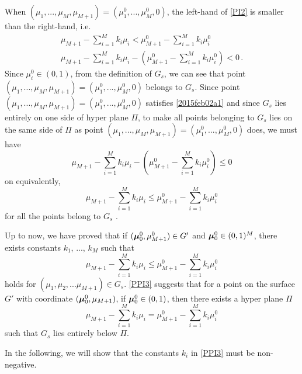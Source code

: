 When $(\mu_1, ... ,\mu_M, \mu_{M+1})=(\mu_1^0, ..., \mu_M^0, 0)$, the left-hand of \eqref{PI2} is smaller than the right-hand, i.e.
\begin{equation}
  \begin{split}
 \mu_{M+1} - \sum_{i=1}^{M}k_i\mu_i < \mu_{M+1}^0 - \sum_{i=1}^{M}k_i\mu_i^0\\
 \mu_{M+1} - \sum_{i=1}^{M}k_i\mu_i - (\mu_{M+1}^0 - \sum_{i=1}^{M}k_i\mu_i^0) < 0\,.
 \end{split}
  \label{2015feb02a1}
\end{equation}
 Since $\mu_i^0 \in (0, 1)$, from the definition of $G_s$, we can see that point $(\mu_1, ... ,\mu_M, \mu_{M+1})=(\mu_1^0, ..., \mu_M^0, 0)$ belongs to $G_s$. 
Since point $(\mu_1, ... ,\mu_M, \mu_{M+1})=(\mu_1^0, ..., \mu_M^0, 0)$ satisfies \eqref{2015feb02a1} and since $G_s$ lies entirely on one side of hyper plane $\Pi$, to make all points belonging to $G_s$ lies on the same side of $\Pi$ as point $(\mu_1, ... ,\mu_M, \mu_{M+1})=(\mu_1^0, ..., \mu_M^0, 0)$ does, we must have
\begin{equation}
\mu_{M+1} - \sum_{i=1}^{M}k_i\mu_i -  ( \mu_{M+1}^0 - \sum_{i=1}^{M}k_i\mu_i^0) \leq 0
\label{PI3}
\end{equation}
on equivalently,
\[
\mu_{M+1} - \sum_{i=1}^{M}k_i\mu_i \leq   \mu_{M+1}^0 - \sum_{i=1}^{M}k_i\mu_i^0
\]
for all the points belong to $G_s$ \cite{dantzig1951fundamental, planeside}. 

Up to now, we have proved that if  $(\boldsymbol{\mu}_0^0, \mu_{M+1}^0) \in G'$ and $\boldsymbol{\mu}_0^0 \in (0, 1)^M$, there exists constants $k_1$, ..., $k_M$ such that
\begin{equation}
\mu_{M+1} - \sum_{i=1}^{M}k_i\mu_i \leq \mu_{M+1}^0 - \sum_{i=1}^{M}k_i\mu_i^0
\label{PPI3}
\end{equation}
holds for  $(\mu_1, \mu_2, ...\mu_{M+1}) \in G_s$. 
\eqref{PPI3} suggests that for a point on the surface $G'$ with coordinate $(\boldsymbol{\mu}_0^0, \mu_{M+1})$, if $\boldsymbol{\mu}_0^0 \in (0, 1)$, then there exists a hyper  plane $\Pi$ 
\[
\mu_{M+1} - \sum_{i=1}^{M}k_i\mu_i =  \mu_{M+1}^0 - \sum_{i=1}^{M}k_i\mu_i^0 
\]
such that $G_s$ lies entirely below $\Pi$. 

In the following, we will show that the constants $k_i$ in \eqref{PPI3} must be non-negative.   

